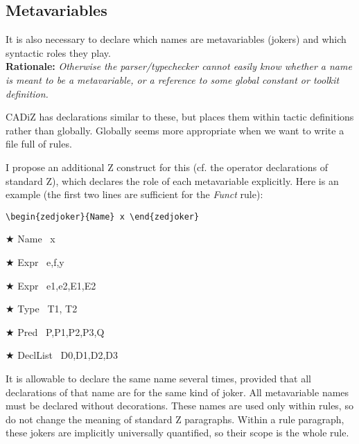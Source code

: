\documentclass{article}
\newenvironment{Rationale}{\\ \textbf{Rationale:}\it}{}
\newenvironment{zedjoker}[1]{\par$\bigstar$ #1\ }{}
\begin{document}
\subsection{Metavariables}

It is also necessary to declare which names are metavariables
(jokers) and which syntactic roles they play.
\begin{Rationale}
  Otherwise the parser/typechecker cannot easily know whether
  a name is meant to be a metavariable, or a reference to some
  global constant or toolkit definition.

  CADiZ has declarations similar to these, but places them
  within tactic definitions rather than globally.  Globally
  seems more appropriate when we want to write a file full
  of rules.
\end{Rationale}

I propose an additional Z construct for this (cf. the operator
declarations of standard Z), which declares the role of each metavariable
explicitly.  Here is an example (the first two lines are sufficient for
the \emph{Funct} rule):

\begin{verbatim}
\begin{zedjoker}{Name} x \end{zedjoker}
\end{verbatim}

\begin{zedjoker}{Name} x \end{zedjoker}
\begin{zedjoker}{Expr} e,f,y \end{zedjoker}
\begin{zedjoker}{Expr} e1,e2,E1,E2 \end{zedjoker}
\begin{zedjoker}{Type} T1, T2 \end{zedjoker}
\begin{zedjoker}{Pred} P,P1,P2,P3,Q \end{zedjoker}
\begin{zedjoker}{DeclList} D0,D1,D2,D3 \end{zedjoker}

It is allowable to declare the same name several times, provided
that all declarations of that name are for the same kind of joker.
All metavariable names must be declared without decorations.  
These names are used only within rules, so do not change the
meaning of standard Z paragraphs.  Within a rule paragraph,
these jokers are implicitly universally quantified, so their
scope is the whole rule.
\end{document}
